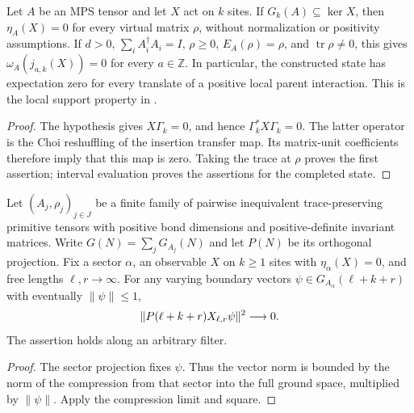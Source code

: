 \begin{lemma}
    \label{thm:mps_state_local_support}
    \leanok
    Let $A$ be an MPS tensor and let $X$ act on $k$ sites. If
    $G_k(A)\subseteq\ker X$, then $\eta_A(X)=0$ for every virtual
    matrix $\rho$, without normalization or positivity assumptions.
    If $d>0$, $\sum_i A_i^\dagger A_i=I$, $\rho\geq0$,
    $E_A(\rho)=\rho$, and $\operatorname{tr}\rho\neq0$, this gives
    $\omega_A(j_{a,k}(X))=0$ for every $a\in\mathbb Z$.
    In particular, the constructed state has expectation zero for every
    translate of a positive local parent interaction.
    This is the local support property in
    \cite[Theorem~1.1 and Section~3]{Nachtergaele1996Spectral}.
\end{lemma}
\begin{proof}\leanok
    The hypothesis gives $X\Gamma_k=0$, and hence $\Gamma_k^*X\Gamma_k=0$.
    The latter operator is the Choi reshuffling of the insertion transfer
    map. Its matrix-unit coefficients therefore imply that this map is
    zero. Taking the trace at $\rho$ proves the first assertion; interval
    evaluation proves the assertions for the completed state.
\end{proof}

\begin{lemma}
    \label{thm:multiblock_sector_excitation_projection_limit}
    \leanok
    Let $(A_j,\rho_j)_{j\in J}$ be a finite family of pairwise inequivalent
    trace-preserving primitive tensors with positive bond dimensions and
    positive-definite invariant matrices. Write
    $G(N)=\sum_jG_{A_j}(N)$ and let $P(N)$ be its orthogonal projection.
    Fix a sector $\alpha$, an observable $X$ on $k\geq1$ sites with
    $\eta_\alpha(X)=0$, and free lengths $\ell,r\longrightarrow\infty$.
    For any varying boundary vectors $\psi\in G_{A_\alpha}(\ell+k+r)$
    with eventually $\|\psi\|\leq1$,
    \begin{align}
        \|P(\ell+k+r)X_{\ell,r}\psi\|^2\longrightarrow0.
        \notag
    \end{align}
    The assertion holds along an arbitrary filter.
\end{lemma}
\begin{proof}\leanok
    The sector projection fixes $\psi$. Thus the vector norm is bounded
    by the norm of the compression from that sector into the full ground
    space, multiplied by $\|\psi\|$. Apply the compression limit and square.
\end{proof}

